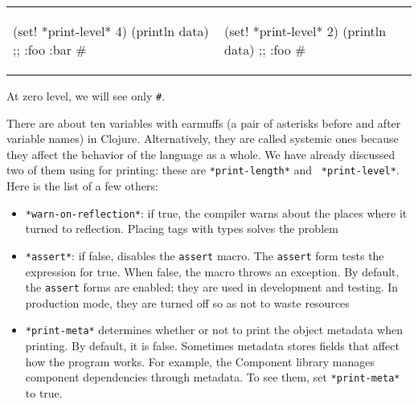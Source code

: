 \else

\begin{english}
\noindent
\begin{tabular}{ @{}p{5cm} @{}p{5cm} }


  \begin{clojure}
(set! *print-level* 4)
(println data)
;; {:foo {:bar #}}
  \end{clojure}

&

  \begin{clojure}
(set! *print-level* 2)
(println data)
;; {:foo #}
  \end{clojure}

\end{tabular}

\end{english}

\fi

\noindent
At zero level, we will see only \verb|#|.

There are about ten variables with earmuffs (a pair of asterisks before and after variable names) in Clojure. Alternatively, they are called systemic ones because they affect the behavior of the language as a whole. We have already discussed two of them using for printing: these are \verb|*print-length*| and ~\verb|*print-level*|.
Here is the list of a few others:


\begin{itemize}


\item
  \verb|*warn-on-reflection*|: if true, the compiler warns about the places where it turned to reflection. Placing tags with types solves the problem


\item
  \verb|*assert*|: if false, disables the \verb|assert| macro. The \verb|assert| form tests the expression for true. When false, the macro throws an exception. By default, the \verb|assert| forms are enabled; they are used in development and testing. In production mode, they are turned off so as not to waste resources

\label{print-meta}


\item
  \verb|*print-meta*| determines whether or not to print the object metadata when printing.
By default, it is false. Sometimes metadata stores fields that affect how the program works.
For example, the Component library manages component dependencies through metadata.
To see them, set \verb|*print-meta*| to true.

\end{itemize}


